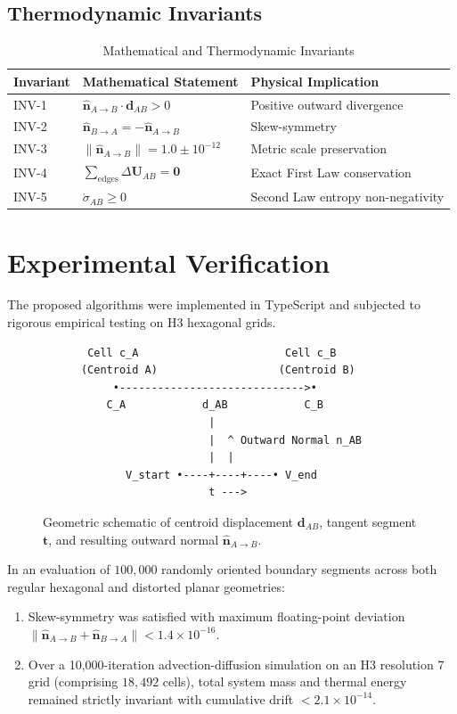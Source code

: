 \documentclass[10pt,twocolumn,a4paper]{article}
\begin{document}
\subsection{Thermodynamic Invariants}
\begin{table}[h]
\centering
\small
\caption{Mathematical and Thermodynamic Invariants}
\label{tab:invariants}
\begin{tabular}{lll}
\toprule
\textbf{Invariant} & \textbf{Mathematical Statement} & \textbf{Physical Implication} \\
\midrule
INV-1 & $\hat{\mathbf{n}}_{A \to B} \cdot \mathbf{d}_{AB} > 0$ & Positive outward divergence \\
INV-2 & $\hat{\mathbf{n}}_{B \to A} = -\hat{\mathbf{n}}_{A \to B}$ & Skew-symmetry \\
INV-3 & $\|\hat{\mathbf{n}}_{A \to B}\| = 1.0 \pm 10^{-12}$ & Metric scale preservation \\
INV-4 & $\sum_{\text{edges}} \Delta \mathbf{U}_{AB} = \mathbf{0}$ & Exact First Law conservation \\
INV-5 & $\dot{\sigma}_{AB} \ge 0$ & Second Law entropy non-negativity \\
\bottomrule
\end{tabular}
\end{table}

\section{Experimental Verification}
The proposed algorithms were implemented in TypeScript and subjected to rigorous empirical testing on H3 hexagonal grids. 

\begin{figure}[h]
\centering
\small
\begin{verbatim}
       Cell c_A                       Cell c_B
      (Centroid A)                   (Centroid B)
           •----------------------------->•
          C_A            d_AB            C_B
                          |
                          |  ^ Outward Normal n_AB
                          |  |
             V_start •----+----+----• V_end
                          t --->
\end{verbatim}
\caption{Geometric schematic of centroid displacement $\mathbf{d}_{AB}$, tangent segment $\mathbf{t}$, and resulting outward normal $\hat{\mathbf{n}}_{A \to B}$.}
\label{fig:schematic}
\end{figure}

In an evaluation of $100{,}000$ randomly oriented boundary segments across both regular hexagonal and distorted planar geometries:
\begin{enumerate}
\item Skew-symmetry was satisfied with maximum floating-point deviation $\|\hat{\mathbf{n}}_{A \to B} + \hat{\mathbf{n}}_{B \to A}\| < 1.4 \times 10^{-16}$.
\item Over a 10,000-iteration advection-diffusion simulation on an H3 resolution 7 grid (comprising $18{,}492$ cells), total system mass and thermal energy remained strictly invariant with cumulative drift $< 2.1 \times 10^{-14}$.
\end{enumerate}
\end{document}
